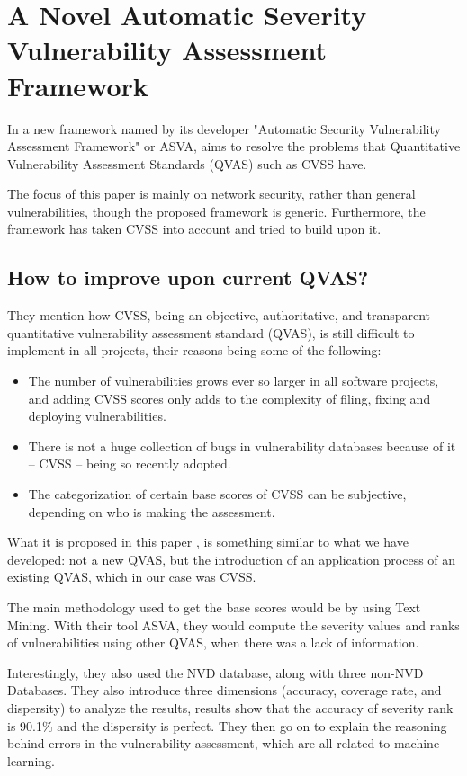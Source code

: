 \section{A Novel Automatic Severity Vulnerability Assessment Framework}

In \parencite{novelty} a new framework named by its developer "Automatic Security Vulnerability Assessment Framework" or ASVA, aims to resolve the problems that Quantitative Vulnerability Assessment Standards (QVAS) such as CVSS have.

The focus of this paper is mainly on network security, rather than general vulnerabilities, though the proposed framework is generic. Furthermore, the framework has taken CVSS into account and tried to build upon it.

\subsection{How to improve upon current QVAS?}

They mention how CVSS, being an objective, authoritative, and transparent quantitative vulnerability assessment standard (QVAS), is still difficult to implement in all projects, their reasons being some of the following:

\begin{itemize}
	\item The number of vulnerabilities grows ever so larger in all software projects, and adding CVSS scores only adds to the complexity of filing, fixing and deploying vulnerabilities.
	\item There is not a huge collection of bugs in vulnerability databases because of it -- CVSS -- being so recently adopted.
	\item The categorization of certain base scores of CVSS can be subjective, depending on who is making the assessment.
\end{itemize}

What it is proposed in this paper \parencite{novelty}, is something similar to what we have developed: not a new QVAS, but the introduction of an application process of an existing QVAS, which in our case was CVSS.

The main methodology used to get the base scores would be by using Text Mining. With their tool ASVA, they would compute the severity values and ranks of vulnerabilities using other QVAS, when there was a lack of information.

Interestingly, they also used the NVD database, along with three non-NVD Databases. They also introduce three dimensions (accuracy, coverage rate, and dispersity) to analyze the results, results show that the accuracy of severity rank is 90.1\% and the dispersity
is perfect. They then go on to explain the reasoning behind errors in the vulnerability assessment, which are all related to machine learning.

